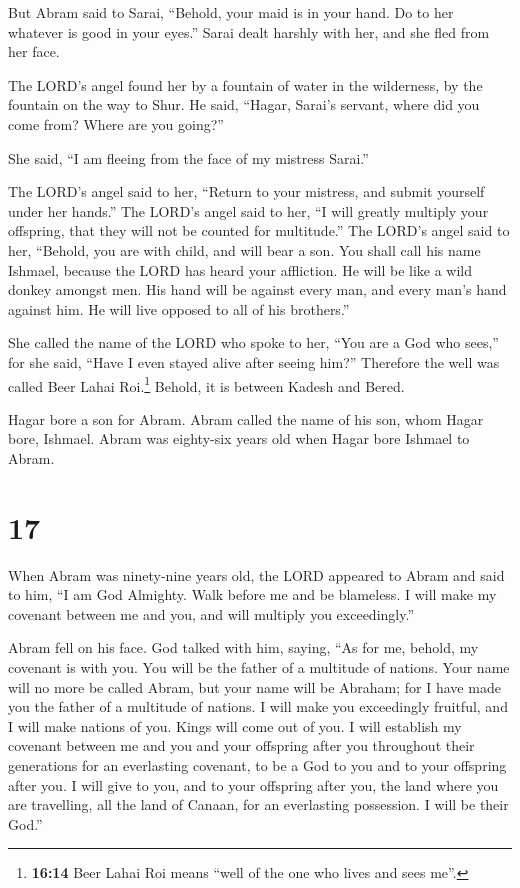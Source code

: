  But Abram said to Sarai, ``Behold, your maid is in your
hand. Do to her whatever is good in your eyes.'' Sarai dealt harshly
with her, and she fled from her face.

 The LORD's angel found her by a fountain of water in the
wilderness, by the fountain on the way to Shur.  He said,
``Hagar, Sarai's servant, where did you come from? Where are you
going?''

She said, ``I am fleeing from the face of my mistress Sarai.''

 The LORD's angel said to her, ``Return to your mistress,
and submit yourself under her hands.''  The LORD's angel
said to her, ``I will greatly multiply your offspring, that they will
not be counted for multitude.''  The LORD's angel said to
her, ``Behold, you are with child, and will bear a son. You shall call
his name Ishmael, because the LORD has heard your affliction.
 He will be like a wild donkey amongst men. His hand will
be against every man, and every man's hand against him. He will live
opposed to all of his brothers.''

 She called the name of the LORD who spoke to her, ``You
are a God who sees,'' for she said, ``Have I even stayed alive after
seeing him?''  Therefore the well was called Beer Lahai
Roi.\footnote{\textbf{16:14} Beer Lahai Roi means ``well of the one who
  lives and sees me''.} Behold, it is between Kadesh and Bered.

 Hagar bore a son for Abram. Abram called the name of his
son, whom Hagar bore, Ishmael.  Abram was eighty-six
years old when Hagar bore Ishmael to Abram.

\hypertarget{section-16}{%
\section{17}\label{section-16}}

 When Abram was ninety-nine years old, the LORD appeared
to Abram and said to him, ``I am God Almighty. Walk before me and be
blameless.  I will make my covenant between me and you,
and will multiply you exceedingly.''

 Abram fell on his face. God talked with him, saying,
 ``As for me, behold, my covenant is with you. You will be
the father of a multitude of nations.  Your name will no
more be called Abram, but your name will be Abraham; for I have made you
the father of a multitude of nations.  I will make you
exceedingly fruitful, and I will make nations of you. Kings will come
out of you.  I will establish my covenant between me and
you and your offspring after you throughout their generations for an
everlasting covenant, to be a God to you and to your offspring after
you.  I will give to you, and to your offspring after you,
the land where you are travelling, all the land of Canaan, for an
everlasting possession. I will be their God.''

